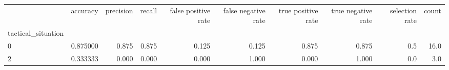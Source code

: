 \begin{tabular}{lrrrrrrrrr}
\toprule
{} &  accuracy &  precision &  recall &  false positive rate &  false negative rate &  true positive rate &  true negative rate &  selection rate &  count \\
tactical\_situation &           &            &         &                      &                      &                     &                     &                 &        \\
\midrule
0                  &  0.875000 &      0.875 &   0.875 &                0.125 &                0.125 &               0.875 &               0.875 &             0.5 &   16.0 \\
2                  &  0.333333 &      0.000 &   0.000 &                0.000 &                1.000 &               0.000 &               1.000 &             0.0 &    3.0 \\
\bottomrule
\end{tabular}
